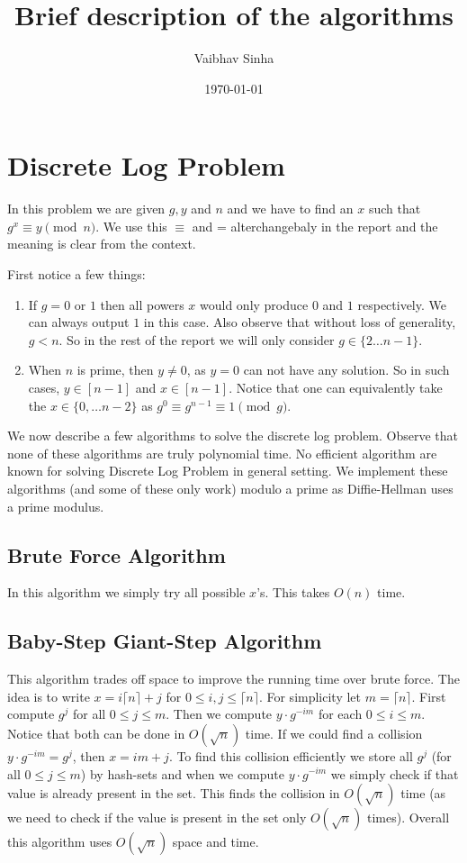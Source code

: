 \documentclass[letterpaper,12pt]{article}
\theoremstyle{remark}
\begin{document}
\title{Brief description of the algorithms}
\date{\today}
\author{Vaibhav Sinha}
\maketitle

\section{Discrete Log Problem}

In this problem we are given $g, y$ and $n$ and we have to find an $x$ such that $g^x \equiv y \pmod n$. We use this $\equiv$ and = alterchangebaly in the report and the meaning is clear from the context.

First notice a few things:
\begin{enumerate}
    \item If $g = 0$ or $1$ then all powers $x$ would only produce $0$ and $1$ respectively. We can always output $1$ in this case. Also observe that without loss of generality, $g < n$. So in the rest of the report we will only consider $g \in \{2 \dots n-1\}$. 
    \item When $n$ is prime, then $y \neq 0$, as $y = 0$ can not have any solution. So in such cases, $y \in [n-1]$ and $x \in [n-1]$. Notice that one can equivalently take the $x \in \{0, \dots n-2\}$ as $g^0 \equiv g^{n-1} \equiv 1 \pmod g$.
\end{enumerate}

We now describe a few algorithms to solve the discrete log problem. Observe that none of these algorithms are truly polynomial time. No efficient algorithm are known for solving Discrete Log Problem in general setting. We implement these algorithms (and some of these only work) modulo a prime as Diffie-Hellman uses a prime modulus.

\subsection{Brute Force Algorithm}
In this algorithm we simply try all possible $x$'s. This takes $O(n)$ time.

\subsection{Baby-Step Giant-Step Algorithm}

This algorithm trades off space to improve the running time over brute force. The idea is to write $x = i\lceil n \rceil + j$ for $0 \le i,j \le \lceil n \rceil$. For simplicity let $m = \lceil n \rceil$. First compute $g^j$ for all $0 \le j \le m$. Then we compute $y\cdot g^{-im}$ for each $0 \le i \le m$. Notice that both can be done in $O(\sqrt n )$ time. If we could find a collision $y\cdot g^{-im} = g^j$, then $x = im + j$. To find this collision efficiently we store all $g^j$ (for all $0 \le j \le m$) by hash-sets and when we compute $y\cdot g^{-im}$ we simply check if that value is already present in the set. This finds the collision in $O(\sqrt{n})$ time (as we need to check if the value is present in the set only $O(\sqrt{n})$ times). Overall this algorithm uses $O(\sqrt{n})$ space and time.
\end{document}
